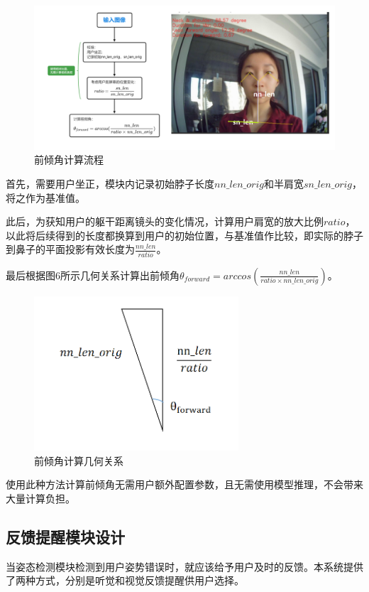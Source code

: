 \documentclass[12pt,a4paper]{article}%
\begin{document}
\begin{figure}[H]
\centering
\includegraphics[width=.9\textwidth]{./Part3-Design.pic/image-20230102164432635.png}
\caption{前倾角计算流程}
\end{figure}
\par
首先，需要用户坐正，模块内记录初始脖子长度\(nn\_len\_orig\)和半肩宽\(sn\_len\_orig\)，将之作为基准值。
\par
此后，为获知用户的躯干距离镜头的变化情况，计算用户肩宽的放大比例\(ratio\)，以此将后续得到的长度都换算到用户的初始位置，与基准值作比较，即实际的脖子到鼻子的平面投影有效长度为\(\frac{nn\_len}{ratio}\)。
\par
最后根据图6所示几何关系计算出前倾角\(\theta_{forward} = arccos(\frac{nn\_len}{ratio\times nn\_len\_orig})\)。

\begin{figure}[H]
\centering
\includegraphics[width=3in]{./Part3-Design.pic/image-20230102170149129.png}
\caption{前倾角计算几何关系}
\end{figure}

使用此种方法计算前倾角无需用户额外配置参数，且无需使用模型推理，不会带来大量计算负担。


\subsection{反馈提醒模块设计}

当姿态检测模块检测到用户姿势错误时，就应该给予用户及时的反馈。本系统提供了两种方式，分别是听觉和视觉反馈提醒供用户选择。
\end{document}
